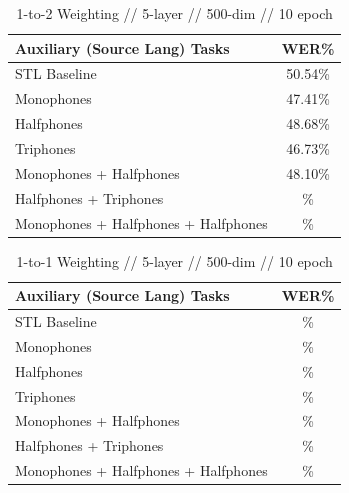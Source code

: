 \documentclass[a4paper]{article}
\begin{document}
\begin{table}[!htbp]
  \centering
    \caption{1-to-2 Weighting // 5-layer // 500-dim //  10 epoch }
  \begin{adjustbox}{width=.45\textwidth}
    \begin{tabular}{lc}
      \toprule
      \textbf{Auxiliary (Source Lang) Tasks} & \textbf{WER\%}\\
      \midrule
      STL Baseline                          &  50.54\% \\
      Monophones                            &  47.41\% \\
      Halfphones                            &  48.68\% \\
      Triphones                             &  46.73\%  \\
      Monophones + Halfphones               &  48.10\%  \\
      Halfphones + Triphones                &  \%  \\
      Monophones + Halfphones + Halfphones  &  \%  \\
      \bottomrule
    \end{tabular}
    \label{table:data}
  \end{adjustbox}
\end{table}


\begin{table}[!htbp]
  \centering
    \caption{1-to-1 Weighting // 5-layer // 500-dim //  10 epoch }
  \begin{adjustbox}{width=.45\textwidth}
    \begin{tabular}{lc}
      \toprule
      \textbf{Auxiliary (Source Lang) Tasks} & \textbf{WER\%}\\
      \midrule
      STL Baseline &  \% \\
      Monophones &  \% \\
      Halfphones &  \% \\
      Triphones &  \%  \\
      Monophones + Halfphones & \%  \\
      Halfphones + Triphones & \%  \\
      Monophones + Halfphones + Halfphones & \%  \\
      \bottomrule
    \end{tabular}
    \label{table:data}
  \end{adjustbox}
\end{table}
\end{document}
